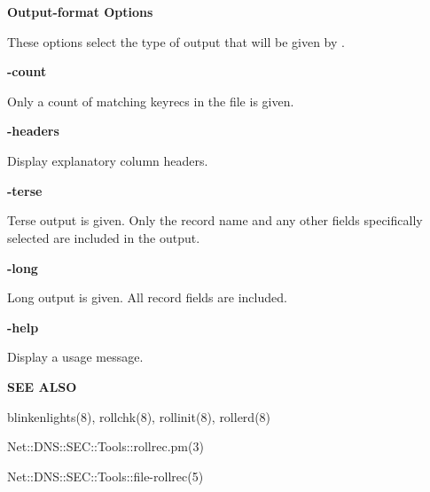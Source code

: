 {\bf Output-format Options}

These options select the type of output that will be given by .

\begin{description}

\item {\bf -count}\verb" "

Only a count of matching keyrecs in the  file is given.

\item {\bf -headers}\verb" "

Display explanatory column headers.

\item {\bf -terse}\verb" "

Terse output is given.  Only the record name and any other fields specifically
selected are included in the output.

\item {\bf -long}\verb" "

Long output is given.  All record fields are included.

\item {\bf -help}\verb" "

Display a usage message.

\end{description}

{\bf SEE ALSO}

blinkenlights(8),
rollchk(8),
rollinit(8),
rollerd(8)

Net::DNS::SEC::Tools::rollrec.pm(3)

Net::DNS::SEC::Tools::file-rollrec(5)

